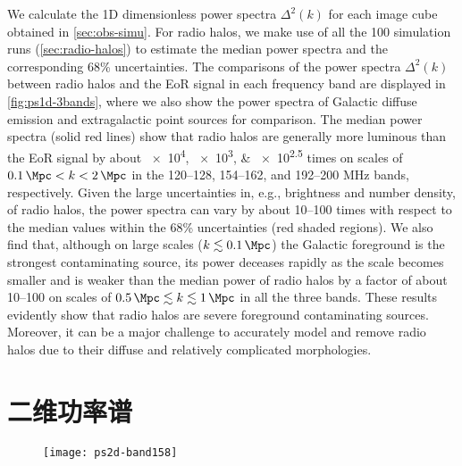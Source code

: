 We calculate the 1D dimensionless power spectra $\Delta^2(k)$ for each
image cube obtained in \autoref{sec:obs-simu}.
For radio halos, we make use of all the 100 simulation runs
(\autoref{sec:radio-halos}) to estimate the median power spectra and
the corresponding 68\% uncertainties.
The comparisons of the power spectra $\Delta^2(k)$ between radio halos
and the EoR signal in each frequency band are displayed
in \autoref{fig:ps1d-3bands}, where we also show the power spectra of
Galactic diffuse emission and extragalactic point sources for comparison.
The median power spectra (solid red lines) show that radio halos are
generally more luminous than the EoR signal by about
\numlist{e4; e3; e2.5} times
on scales of $\SI{0.1}{\per\Mpc} < k < \SI{2}{\per\Mpc}$
in the \numrange{120}{128}, \numrange{154}{162}, and \numrange{192}{200}
\si{\MHz} bands, respectively.
Given the large uncertainties in, e.g., brightness and number density,
of radio halos, the power spectra can vary by about \numrange{10}{100}
times with respect to the median values within the 68\%
uncertainties (red shaded regions).
We also find that, although on large scales
($k \lesssim \SI{0.1}{\per\Mpc}$) the Galactic foreground is the
strongest contaminating source, its power deceases rapidly as the
scale becomes smaller and is weaker than the median power of radio halos
by a factor of about \numrange{10}{100} on scales of
$\SI{0.5}{\per\Mpc} \lesssim k \lesssim \SI{1}{\per\Mpc}$
in all the three bands.
These results evidently show that radio halos are severe foreground
contaminating sources.
Moreover, it can be a major challenge to accurately model and remove radio
halos due to their diffuse and relatively complicated morphologies.


\section{二维功率谱}
\label{sec:ps2d}

\begin{figure}[htp]
  \centering
  \texttt{[image: ps2d-band158]}
  \label{fig:ps2d}
\end{figure}


